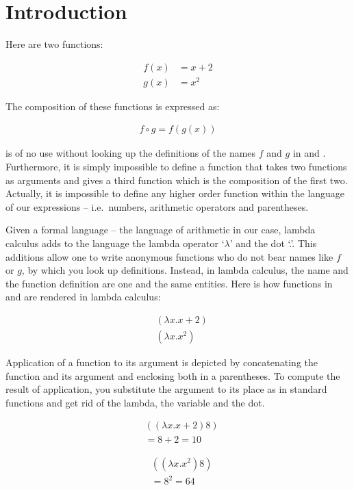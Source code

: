 \documentclass[11pt]{article}
\begin{document}
\section{Introduction} Here are two functions:

\begin{align}
\label{f} f(x) & = x + 2\\ 
\label{g}g(x) & = x^2
\end{align}

The composition of these functions is expressed as:

\begin{align}
f\circ g = f(g(x))\label{fog}
\end{align}


 is of no use without looking up the definitions of the names $f$ and $g$ in  and . Furthermore, it is simply impossible to define a function that takes two functions as arguments and gives a third function which is the composition of the first two. Actually, it is impossible to define any higher order function within the language of our expressions -- i.e.\ numbers, arithmetic operators and parentheses.

Given a formal language -- the language of arithmetic in our case, lambda calculus adds to the language the lambda operator `$\lambda$' and the dot `.'. This additions allow one to write anonymous functions who do not bear names like $f$ or $g$, by which you look up definitions. Instead, in lambda calculus, the name and the function definition are one and the same entities. Here is how functions in  and  are rendered in lambda calculus:

\begin{align}
\label{lf} & (\lambda x.x + 2)\\ 
\label{lg} & (\lambda x.x^2)
\end{align}

Application of a function to its argument is depicted by concatenating the function and its argument and enclosing both in a parentheses. To compute the result of application, you substitute the argument to its place as in standard functions and get rid of the lambda, the variable and the dot.

\begin{align}
\label{af} & ((\lambda x.x + 2) 8)\\ 
 & = 8 +2  = 10\nonumber
\end{align}

\begin{align}
\label{ag} & ((\lambda x.x^2) 8)\\
& = 8^2 = 64\nonumber
\end{align}
\end{document}
